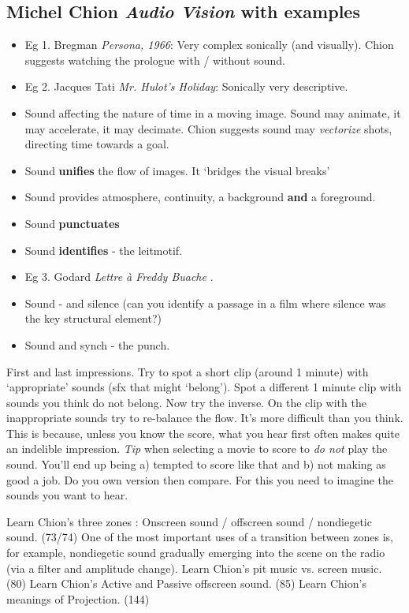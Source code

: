 \subsection{Michel Chion \textit{Audio Vision} with examples}
\begin{itemize}
\item Eg 1. Bregman \textit{Persona, 1966}: Very complex sonically (and visually). Chion suggests watching the prologue with / without sound. 
\item Eg 2. Jacques Tati \textit{Mr. Hulot's Holiday}: Sonically very descriptive. 
\item Sound affecting the nature of time in a moving image. Sound may animate, it may accelerate, it may decimate. Chion suggests sound may \textit{vectorize} shots, directing time towards a goal.
\item Sound \textbf{unifies} the flow of images. It `bridges the visual breaks' \citep[p.47]{chion1990} 
\item Sound provides atmosphere, continuity, a background \textbf{and} a foreground. 
\item Sound \textbf{punctuates}
\item Sound \textbf{identifies} - the leitmotif.
\item Eg 3. Godard \textit{Lettre \`a Freddy Buache} \citep[p.56]{chion1990}. 
\item Sound - and silence (can you identify a passage in a film where silence was the key structural element?)
\item Sound and synch - the punch. 
\end{itemize}

First and last impressions. Try to spot a short clip (around 1 minute) with `appropriate' sounds (sfx that might `belong'). Spot a different 1 minute clip with sounds you think do not belong. Now try the inverse. On the clip with the inappropriate sounds try to re-balance the flow. It's more difficult than you think. This is because, unless you know the score, what you hear first often makes quite an indelible impression. \textit{Tip} when selecting a movie to score to \textit{do not} play the sound. You'll end up being a) tempted to score like that and b) not making as good a job. Do you own version then compare. For this you need to imagine the sounds you want to hear. 

Learn Chion's three zones \citep[p.73]{chion1990}: Onscreen sound / offscreen sound / nondiegetic sound. (73/74)
One of the most important uses of a transition between zones is, for example, nondiegetic sound gradually emerging into the scene on the radio (via a filter and amplitude change). 
Learn Chion's pit music vs. screen music. (80)
Learn Chion's Active and Passive offscreen sound. (85) 
Learn Chion's meanings of Projection. (144) 

